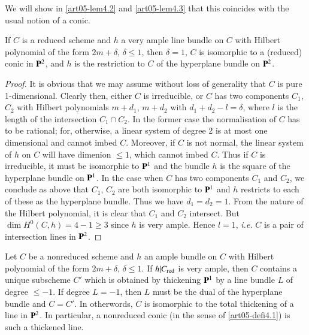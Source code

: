 We will show in \ref{art05-lem4.2} and \ref{art05-lem4.3} that this coincides with the usual notion
of a conic. 

\begin{lemma}\label{art05-lem4.2}
If $C$ is a reduced scheme and $h$ a very ample line bundle on $C$
with Hilbert polynomial of the form $2m+\delta$, $\delta\leq 1$, then
$\delta=1$, $C$ is isomorphic to a (reduced) conic in $\mathbf{P}^{2}$, and
$h$ is the restriction to $C$ of the hyperplane bundle on $\mathbf{P}^{2}$.
\end{lemma}

\begin{proof}
It is obvious that we may assume without loss of generality that $C$
is pure 1-dimensional. Clearly then, either $C$ is irreducible, or $C$
has two components $C_{1}$, $C_{2}$ with Hilbert polynomials
$m+d_{1}$, $m+d_{2}$ with $d_{1}+d_{2}-l=\delta$, where $l$ is the
length of the intersection $C_{1}\cap C_{2}$. In the former case the
normalisation of $C$ has to be rational; for, otherwise, a linear
system of degree 2 is at most one dimensional and cannot imbed
$C$. Moreover, if $C$ is not normal, the linear system of $h$ on $C$
will have dimenion $\leq 1$, which cannot imbed $C$. Thus if $C$ is
irreducible, it must be isomorphic to $\mathbf{P}^{1}$ and the bundle $h$ is
the square of the hyperplane bundle on $\mathbf{P}^{1}$. In the case when
$C$ has two components $C_{1}$ and $C_{2}$, we conclude as above that
$C_{1}$, $C_{2}$ are both isomorphic to $\mathbf{P}^{1}$ and $h$ restricts
to each of these as the hyperplane bundle. Thus we have
$d_{1}=d_{2}=1$. From the nature of the Hilbert polynomial, it is
clear that $C_{1}$ and $C_{2}$ intersect. But $\dim H^{0}(C,h)=4-1\geq
3$ since $h$ is very ample. Hence $l=1$, {\em i.e.} $C$ is a pair of
intersection lines in $\mathbf{P}^{2}$.
\end{proof}

\begin{lemma}\label{art05-lem4.3}
Let $C$ be a nonreduced scheme and $h$ an ample bundle on $C$ with
Hilbert polynomial of the form $2m+\delta$, $\delta\leq 1$. If
$h|C_{\operatorname{red}}$ is very ample, then $C$ contains a unique subscheme $C'$
which is obtained by thickening $\mathbf{P}^{1}$ by a line bundle $L$ of
degree $\leq -1$. If degree $L=-1$, then $L$ must be the dual of the
hyperplane bundle and $C=C'$. In otherwords, $C$ is isomorphic to the
total thickening of a line in $\mathbf{P}^{2}$. In particular, a nonreduced
conic (in the sense of \ref{art05-defi4.1}) is such a thickened line. 
\end{lemma}


